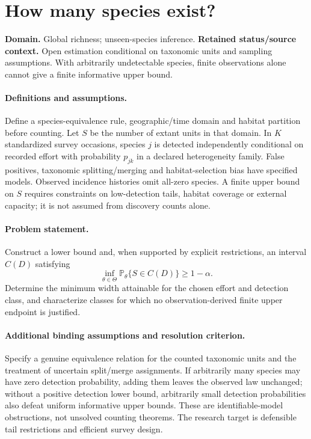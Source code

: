\documentclass[11pt]{article}
\begin{document}
\section*{How many species exist?}
\label{prob:314}
\label{rank:316}
\par\smallskip

\noindent\textbf{Domain.} Global richness; unseen-species inference. \quad \textbf{Retained status/source context.} Open estimation conditional on taxonomic units and sampling assumptions. With arbitrarily undetectable species, finite observations alone cannot give a finite informative upper bound.

\paragraph{Definitions and assumptions.} Define a species-equivalence rule, geographic/time domain and habitat partition before counting. Let $S$ be the number of extant units in that domain. In $K$ standardized survey occasions, species $j$ is detected independently conditional on recorded effort with probability $p_{jk}$ in a declared heterogeneity family. False positives, taxonomic splitting/merging and habitat-selection bias have specified models. Observed incidence histories omit all-zero species. A finite upper bound on $S$ requires constraints on low-detection tails, habitat coverage or external capacity; it is not assumed from discovery counts alone.

\paragraph{Problem statement.} Construct a lower bound and, when supported by explicit restrictions, an interval $C(D)$ satisfying
    \[\inf_{\theta\in\Theta}\mathbb{P}_\theta\{S\in C(D)\}\geq1-\alpha.\]
    Determine the minimum width attainable for the chosen effort and detection class, and characterize classes for which no observation-derived finite upper endpoint is justified.

\paragraph{Additional binding assumptions and resolution criterion.} Specify a genuine equivalence relation for the counted taxonomic units and the treatment of uncertain split/merge assignments. If arbitrarily many species may have zero detection probability, adding them leaves the observed law unchanged; without a positive detection lower bound, arbitrarily small detection probabilities also defeat uniform informative upper bounds. These are identifiable-model obstructions, not unsolved counting theorems. The research target is defensible tail restrictions and efficient survey design.
\end{document}
